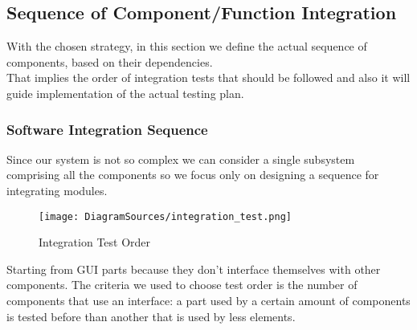 \subsection{Sequence of Component/Function Integration}
With the chosen strategy, in this section we define the actual sequence of components, based on their dependencies.\\ 
That implies the order of integration tests that should be followed and also it will guide implementation of the actual testing plan. 
\subsubsection{Software Integration Sequence}
Since our system is not so complex we can consider a single subsystem comprising all the components so we focus only on designing a sequence for integrating modules.
\begin{figure}[H]
\centering
\texttt{[image: DiagramSources/integration\_test.png]}
\label{Figure 2:}\caption{ Integration Test Order}
\end{figure}
Starting from GUI parts because they don't interface themselves with other components. The criteria we used to choose test order is the number of components that use an interface: a part used by a certain amount of components is tested before than another that is used by less elements. 